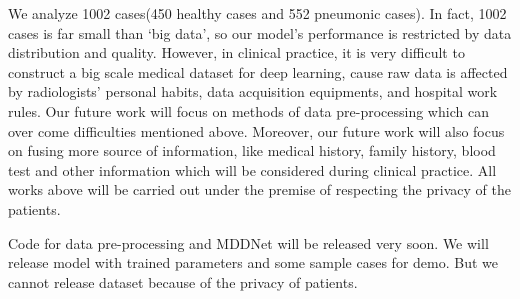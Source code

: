 \documentclass[journal]{IEEEtran}
\begin{document}
We analyze 1002 cases(450 healthy cases and 552 pneumonic cases). In fact, 1002 cases is far small than `big data', so our model's performance is restricted by data distribution and quality. However, in clinical practice, it is very difficult to construct a big scale medical dataset for deep learning, cause raw data is affected by radiologists' personal habits, data acquisition equipments, and hospital work rules. Our future work will focus on methods of data pre-processing which can over come difficulties mentioned above.
Moreover, our future work will also focus on fusing more source of information, like medical history, family history, blood test and other information which will be considered during clinical practice. All works above will be carried out under the premise of respecting the privacy of the patients.
 
Code for data pre-processing and MDDNet will be released very soon. We will release model with trained parameters and some sample cases for demo. But we cannot release dataset because of the privacy of patients. 



%


\end{document}
